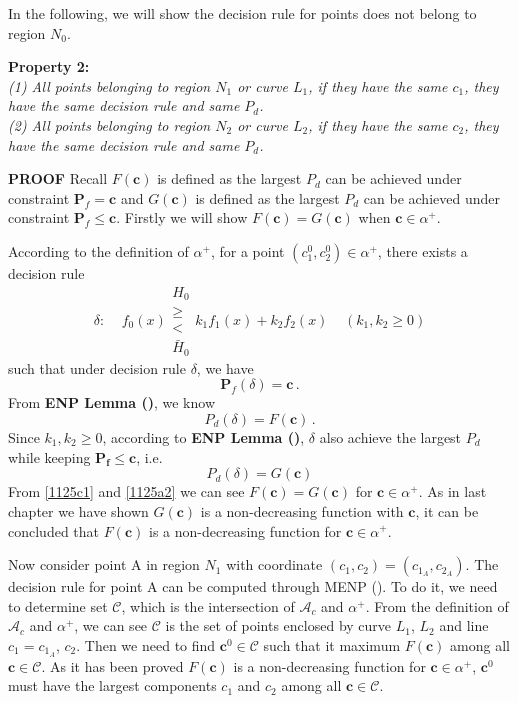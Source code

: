 In the following, we will show the decision rule for points does not belong to region $N_0$.

\noindent \textbf{Property 2:}
\textit{\\(1) All points belonging to region $N_1$ or curve $L_1$, if they have the same $c_1$, they have the same decision rule and same $P_d$.
\\(2) All points belonging to region $N_2$ or curve $L_2$, if they have the same $c_2$, they have the same decision rule and same $P_d$.
}

\noindent \textbf{PROOF}
Recall $F(\mathbf{c})$ is defined as the largest $P_d$ can be achieved under constraint $\mathbf{P}_f = \mathbf{c}$ and 
       $G(\mathbf{c})$ is defined as the largest $P_d$ can be achieved under constraint $\mathbf{P}_f \leq \mathbf{c}$.
Firstly we will show $F(\mathbf{c}) = G(\mathbf{c}) $ when $\mathbf{c} \in \alpha^+$.

According to the definition of $\alpha^+$, for a point $(c_1^0, c_2^0) \in \alpha^+$, there exists a decision rule 
\[
\delta:\;\;\;\;f_0(x) \substack{H_0 \\ \geq \\ < \\ \bar{H}_0} k_1f_1(x) + k_2f_2(x) \;\;\;\;(k_1, k_2 \geq 0)
\]
such that under decision rule $\delta$, we have 
\begin{equation}
\label{1125a3}
\mathbf{P}_{f}(\delta) = \mathbf{c}\,.
\end{equation}
From \textbf{ENP Lemma ()}, we know 
\begin{equation}
\label{1125c1}
P_d(\delta) = F(\mathbf{c})\,.
\end{equation}
Since $k_1, k_2 \geq 0$, according to \textbf{ENP Lemma ()}, $\delta$ also achieve the largest $P_d$ while keeping $\mathbf{P_f} \leq \mathbf{c}$, i.e. 
\begin{equation}
 P_d(\delta) =G(\mathbf{c}) 
\label{1125a2}
\end{equation}
From \eqref{1125c1} and \eqref{1125a2} we can see $F(\mathbf{c}) = G(\mathbf{c})$ for $\mathbf{c} \in \alpha^+$.
As in last chapter we have shown $G(\mathbf{c})$ is a non-decreasing function with  $\mathbf{c}$, it can be concluded that $F(\mathbf{c})$ is a non-decreasing function for $\mathbf{c} \in \alpha^+$.

Now consider point A in region ${N}_1$ with coordinate $(c_1, c_2) = (c_{1_A}, c_{2_A})$. The decision rule for point A can be computed through MENP (). To do it,  we need to determine set $\mathcal{C}$, which is the intersection of $\mathcal{A}_c$ and $\alpha^+$. From the definition of $\mathcal{A}_c$ and $\alpha^+$, we can see $\mathcal{C}$ is the set of points enclosed by curve $L_1$, $L_2$ and line $c_1 = c_{1_A}$, $c_2$. Then we need to find $\mathbf{c}^0 \in \mathcal{C}$ such that it maximum $F(\mathbf{c})$ among all $\mathbf{c} \in \mathcal{C}$. As it has been proved $F(\mathbf{c})$ is a   non-decreasing function for $\mathbf{c} \in \alpha^+$, $\mathbf{c}^0$ must have the largest components $c_1$ and $c_2$ among all $\mathbf{c} \in \mathcal{C}$. 

